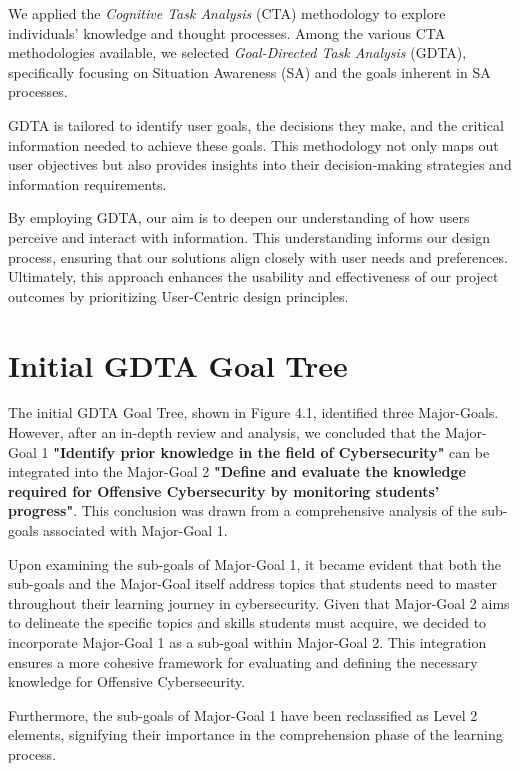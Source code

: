 We applied the \textit{Cognitive Task Analysis} (CTA) methodology to explore individuals' knowledge and thought processes. Among the various CTA methodologies available, we selected \textit{Goal-Directed Task Analysis} (GDTA), specifically focusing on Situation Awareness (SA) and the goals inherent in SA processes.

GDTA is tailored to identify user goals, the decisions they make, and the critical information needed to achieve these goals. This methodology not only maps out user objectives but also provides insights into their decision-making strategies and information requirements.

By employing GDTA, our aim is to deepen our understanding of how users perceive and interact with information. This understanding informs our design process, ensuring that our solutions align closely with user needs and preferences. Ultimately, this approach enhances the usability and effectiveness of our project outcomes by prioritizing User-Centric design principles.

\section{Initial GDTA Goal Tree}
The initial GDTA Goal Tree, shown in Figure 4.1, identified three Major-Goals. However, after an in-depth review and analysis, we concluded that the Major-Goal 1 \textbf{"Identify prior knowledge in the field of Cybersecurity"} can be integrated into the Major-Goal 2 \textbf{"Define and evaluate the knowledge required for Offensive Cybersecurity by monitoring students' progress"}. This conclusion was drawn from a comprehensive analysis of the sub-goals associated with Major-Goal 1.

Upon examining the sub-goals of Major-Goal 1, it became evident that both the sub-goals and the Major-Goal itself address topics that students need to master throughout their learning journey in cybersecurity. Given that Major-Goal 2 aims to delineate the specific topics and skills students must acquire, we decided to incorporate Major-Goal 1 as a sub-goal within Major-Goal 2. This integration ensures a more cohesive framework for evaluating and defining the necessary knowledge for Offensive Cybersecurity.

Furthermore, the sub-goals of Major-Goal 1 have been reclassified as Level 2 elements, signifying their importance in the comprehension phase of the learning process. 

